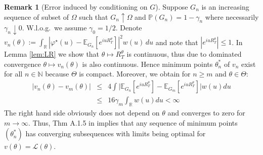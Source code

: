\documentclass[reqno, 11pt]{amsart}%
\newcommand\cL{\mathcal L}
\newcommand\EE{\mathbb E}
\newcommand\PP{\mathbb P}
\newcommand\NN{\mathbb N}
\newcommand\RR{\mathbb R}
\theoremstyle{definition}
\newtheorem{remark}[theorem]{Remark}
\begin{document}
\begin{remark}[Error induced by conditioning on $G$]
Suppose $G_n$ is an increasing sequence of subset of $\Omega$ such that $G_n \uparrow \Omega$ and $\PP(G_n)=1-\gamma_n$ where necessarily $\gamma_n\downarrow 0.$ W.l.o.g.\ we assume $\gamma_0=1/2$. Denote $v_n(\theta) :=  \int_{\mathbb{R}} \left| \varphi^\star(u) - \EE_{G_n}[e^{iu R_T^\theta}]  \right|^2 w(u) \, du$ and  note that  $|e^{iu R_T^\theta}| \le 1$. In Lemma  \ref{lem:LR} we show that $\theta\mapsto R_T^\theta$ is continuous, thus due to dominated convergence $\theta\mapsto  v_n(\theta)$ is also continuous. Hence minimum points $\theta_n^*$ of $v_n$ exist for all $n\in\NN$ because $\Theta$ is compact. Moreover, we obtain for $n\ge m$ and $\theta\in \Theta$:
\begin{eqnarray*}
    |v_n(\theta)-v_m(\theta)| &\le & 4  \int \Big| \EE_{G_n}[e^{iu R_T^\theta}] -  \EE_{G_m}[e^{iu R_T^\theta}]  \Big|  w(u) du \\
    &\le &  16 \gamma_m \int_\RR  w(u) du < \infty
\end{eqnarray*}
  The right hand side obviously does not depend on $\theta$ and converges to zero for $m\to\infty.$ Thus, Thm A.1.5 in \cite{BauerleRieder} implies that any sequence of minimum points $(\theta_n^*)$ has converging subsequences with limits being optimal for $v(\theta)= \cL(\theta).$  
\end{remark}


\end{document}
